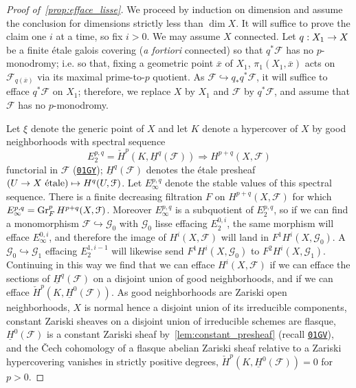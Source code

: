 \documentclass[deligne.tex]{subfiles}
\begin{document}
\begin{proof}[Proof of~\eqref{prop:efface_lisse}]
We proceed by induction on dimension and assume the conclusion for 
dimensions strictly less than $\dim X$.
It will suffice to prove the claim one $i$ at a time, so fix $i>0$.
We may assume $X$ connected.
Let $q:X_1\rightarrow X$ be a finite étale galois covering (\emph{a fortiori} 
connected) so that $q^*\mathcal F$ has no
$p$-monodromy; i.e. so that, fixing a geometric point $\overline x$ of 
$X_1$, $\pi_1(X_1,\overline x)$ acts on $\mathcal F_{q(\overline x)}$ via
its maximal prime-to-$p$ quotient.
As $\mathcal F\hookrightarrow q_*q^*\mathcal F$, it will 
suffice to efface $q^*\mathcal F$ on $X_1$; therefore, we replace $X$ by 
$X_1$ and $\mathcal F$ by $q^*\mathcal F$, and assume that
$\mathcal F$ has no $p$-monodromy.

Let $\xi$ denote the generic point of $X$ and let $K$ denote a hypercover of 
$X$ by good neighborhoods with spectral
sequence
\begin{equation*}
	E_2^{p,q}=\check H^p(K,\underline H^q(\mathcal F))\Rightarrow H^{p+q}(X,\mathcal F)
\end{equation*}
functorial in $\mathcal F$
(\href{https://stacks.math.columbia.edu/tag/01GY}{\texttt{01GY}});
$\underline H^q(\mathcal F)$ denotes the étale presheaf
$(U\rightarrow X\text{ étale})\mapsto H^q(U,\mathcal F)$.
Let $E_\infty^{p,q}$ denote the stable values of this spectral sequence.
There is a finite decreasing filtration $F$ on $H^{p+q}(X,\mathcal F)$
for which $E_\infty^{p,q}=\operatorname{Gr}_F^pH^{p+q}(X,\mathcal F)$.
Moreover $E_\infty^{p,q}$ is a subquotient of $E_2^{p,q}$, so if we can find
a monomorphism $\mathcal F\hookrightarrow\mathcal G_0$ with $\mathcal G_0$ 
lisse effacing $E_2^{0,i}$, the same morphism will efface $E_\infty^{0,i}$,
and therefore the image of $H^i(X,\mathcal F)$ will land in
$F^1H^i(X,\mathcal G_0)$. A $\mathcal G_0\hookrightarrow\mathcal G_1$
effacing $E_2^{1,i-1}$ will likewise send $F^1H^i(X,\mathcal G_0)$ to
$F^2H^i(X,\mathcal G_1)$. Continuing in this way we find that we can efface
$H^i(X,\mathcal F)$ if we can efface the sections of
$\underline H^q(\mathcal F)$ on a disjoint union of good neighborhoods, and
if we can efface $\check H^p(K,\underline H^0(\mathcal F))$.
As good neighborhoods are Zariski open neighborhoods, $X$ is normal 
hence a disjoint union of its irreducible components, constant Zariski
sheaves on a disjoint union of irreducible schemes are flasque, 
$\underline H^0(\mathcal F)$ is a constant Zariski sheaf 
by~\eqref{lem:constant_presheaf} (recall
\href{https://stacks.math.columbia.edu/tag/01GV}{\texttt{01GV}}), and the
\v Cech cohomology of a flasque abelian Zariski sheaf relative to a Zariski
hypercovering vanishes in strictly positive degrees,
$\check H^p(K,\underline H^0(\mathcal F))=0$ for $p>0$.


\end{proof}
\end{document}

